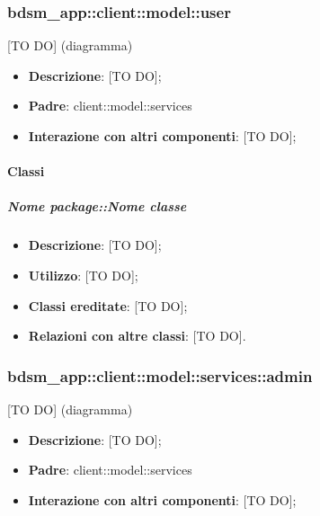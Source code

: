 	\subsubsection{bdsm\_app::client::model::user} %
	\label{ssub:bdsm_app_client_model_user}
	[TO DO] (diagramma) \newline \newline

	\begin{itemize}
		\item \textbf{Descrizione}: [TO DO];
		\item \textbf{Padre}: client::model::services
		\item \textbf{Interazione con altri componenti}: [TO DO];
	\end{itemize}

		\paragraph{Classi} %
			\subparagraph{Nome package::Nome classe} %
			\label{subp:subparagraph_name}
				\begin{itemize}
					\item \textbf{Descrizione}: [TO DO];
					\item \textbf{Utilizzo}: [TO DO];
					\item \textbf{Classi ereditate}: [TO DO];
					\item \textbf{Relazioni con altre classi}: [TO DO].
				\end{itemize}	

	\subsubsection{bdsm\_app::client::model::services::admin} %
	\label{ssub:bdsm_app_client_model_services_admin}
	[TO DO] (diagramma) \newline \newline

	\begin{itemize}
		\item \textbf{Descrizione}: [TO DO];
		\item \textbf{Padre}: client::model::services
		\item \textbf{Interazione con altri componenti}: [TO DO];
	\end{itemize}

